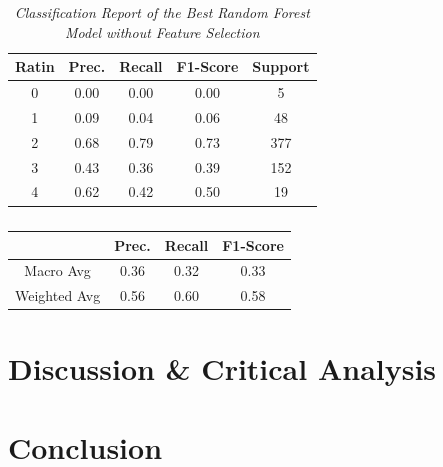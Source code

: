 \documentclass[11pt]{article}
\begin{document}
\begin{table}[!ht]
    \begin{center}
        \begin{tabular}{c|c|c|c|c}			
            \hline
            Ratin & Prec. & Recall & F1-Score & Support \\
            \hline\hline
            0 & 0.00 & 0.00 & 0.00 & 5 \\
            1 & 0.09 & 0.04 & 0.06 & 48 \\
            2 & 0.68 & 0.79 & 0.73 & 377 \\
            3 & 0.43 & 0.36 & 0.39 & 152 \\
            4 & 0.62 & 0.42 & 0.50 & 19\\
                \hline
        \end{tabular}

    \caption{\textit{Classification Report of the Best Random Forest Model without Feature Selection}}
        \label{rf-ft-report}

    \end{center}
\end{table}
\begin{table}[!ht]
    \begin{center}
        \begin{tabular}{c||c|c|c}			
            \hline
             & Prec. & Recall & F1-Score \\
            \hline\hline
            Macro Avg & 0.36 & 0.32 & 0.33 \\
            Weighted Avg & 0.56 & 0.60 & 0.58 \\
                \hline
        \end{tabular}

        \caption{}
        \label{rf-ft-report-sum}

    \end{center}
\end{table}
\section{Discussion \& Critical Analysis}


\section{Conclusion}




\end{document}
